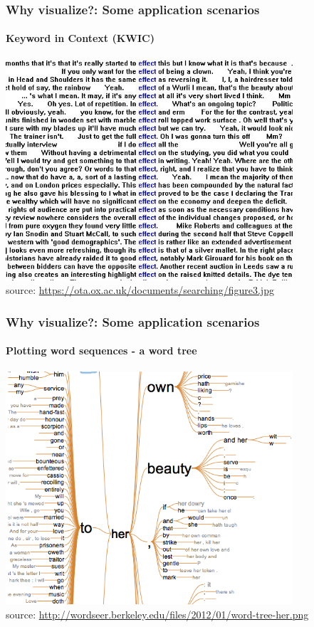 \documentclass{beamer}
\begin{document}
\begin{frame}
\frametitle{Why visualize?: Some application scenarios}
\framesubtitle{Keyword in Context (KWIC)}
\includegraphics[width=0.8\textwidth]{kwic.jpeg} \\
\scriptsize source: \url{https://ota.ox.ac.uk/documents/searching/figure3.jpg} 
\end{frame}

\begin{frame}
\frametitle{Why visualize?: Some application scenarios}
\framesubtitle{Plotting word sequences - a word tree}
\includegraphics[width=0.8\textwidth]{word-tree.png} \\
\scriptsize source: \url{http://wordseer.berkeley.edu/files/2012/01/word-tree-her.png} 
\end{frame}
\end{document}
